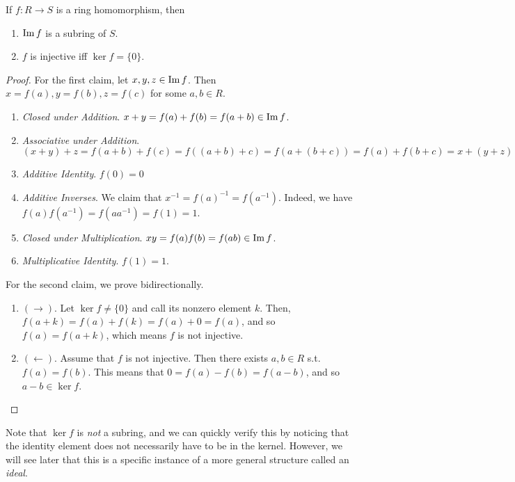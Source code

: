   \begin{lemma}
    If $f: R \rightarrow S$ is a ring homomorphism, then 
    \begin{enumerate}
      \item $\im{f}$ is a subring of $S$. 
      \item $f$ is injective iff $\ker{f} = \{0\}$. 
    \end{enumerate}
  \end{lemma}
  \begin{proof}
    For the first claim, let $x, y, z \in \im{f}$. Then $x = f(a), y = f(b), z = f(c)$ for some $a, b \in R$. 
    \begin{enumerate}
      \item \textit{Closed under Addition}. $x + y = f(a) + f(b) = f(a + b) \in \im{f}$. 
      \item \textit{Associative under Addition}. $(x + y) + z = f(a + b) + f(c) = f((a + b) + c) = f(a + (b + c)) = f(a) + f(b + c) = x + (y + z)$
      \item \textit{Additive Identity}. $f(0) = 0$
      \item \textit{Additive Inverses}. We claim that $x^{-1} = f(a)^{-1} = f(a^{-1})$. Indeed, we have $f(a) f(a^{-1}) = f(a a^{-1}) = f(1) = 1$. 
      \item \textit{Closed under Multiplication}. $xy = f(a) f(b) = f(ab) \in \im{f}$. 
      \item \textit{Multiplicative Identity}. $f(1) = 1$. 
    \end{enumerate}
    For the second claim, we prove bidirectionally. 
    \begin{enumerate}
      \item $(\rightarrow)$. Let $\ker{f} \neq \{0\}$ and call its nonzero element $k$. Then, $f(a + k) = f(a) + f(k) = f(a) + 0 = f(a)$, and so $f(a) = f(a + k)$, which means $f$ is not injective. 
      \item $(\leftarrow)$. Assume that $f$ is not injective. Then there exists $a, b \in R$ s.t. $f(a) = f(b)$. This means that $0 = f(a) - f(b) = f(a - b)$, and so $a - b \in \ker{f}$. 
    \end{enumerate}
  \end{proof}

  Note that $\ker{f}$ is \textit{not} a subring, and we can quickly verify this by noticing that the identity element does not necessarily have to be in the kernel. However, we will see later that this is a specific instance of a more general structure called an \textit{ideal}. 

